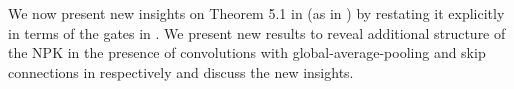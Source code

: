 We now present new insights on Theorem 5.1 in \citep{npk} (as in ) by restating it explicitly in terms of the gates in . We present new results to reveal additional structure of the NPK in the presence of convolutions with global-average-pooling and skip connections in  respectively and discuss the new insights.


